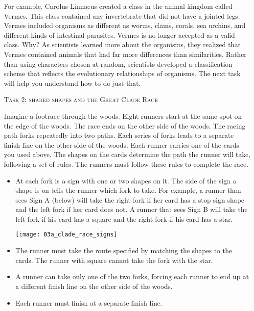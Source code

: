 \documentclass[12pt, hidelinks]{exam}
\begin{document}
For example, Carolus Linnaeus created a class in the animal kingdom called Vermes. This class contained any invertebrate that did not have a jointed legs. Vermes included organisms as different as worms, clams, corals, sea urchins, and different kinds of intestinal parasites. Vermes is no longer accepted as a valid class. Why?  As scientists learned more about the organisms, they realized that Vermes contained animals that had far more differences than similarities. Rather than using characters chosen at random, scientists developed a classification scheme that reflects the evolutionary relationships of organisms. The next task will help you understand how to do just that.\vspace*{2\baselineskip}

\newpage

\noindent\textsc{Task 2: shared shapes and the Great Clade Race}

Imagine a footrace through the woods. Eight runners start at the same spot on the edge of the woods. The race ends on the other side of the woods. The racing path forks repeatedly into two paths. Each series of forks leads to a separate finish line on the other side of the woods. Each runner carries one of the cards you used above. The shapes on the cards determine the path the runner will take, following a set of rules. The runners must follow these rules to complete the race. 

\begin{itemize}

	\item At each fork is a sign with one or two shapes on it. The side of the sign a shape is on tells the runner which fork to take. For example, a runner than sees Sign A (below) will take the right fork if her card has a stop sign shape and the left fork if her card does not. A runner that sees Sign B will take the left fork if his card has a square and the right fork if his card has a star. 
	
	
		\texttt{[image: 03a\_clade\_race\_signs]}
	
	
	\item The runner must take the route specified by matching the shapes to the cards. The runner with square cannot take the fork with the star. 

	\item A runner can take only one of the two forks, forcing each runner to end up at a different finish line on the other side of the woods.
	
	
	
	
	\item Each runner must finish at a separate finish line.

\end{itemize}
\end{document}
